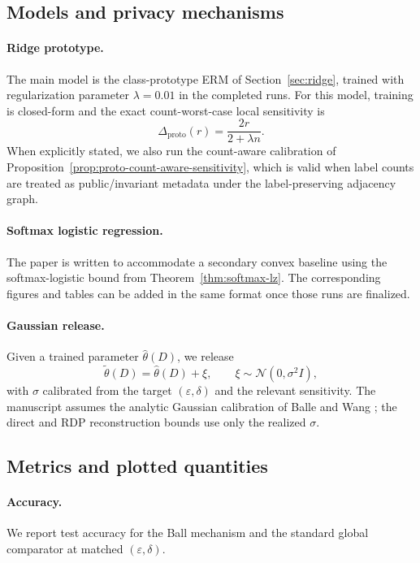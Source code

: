 \documentclass[conference,compsoc]{IEEEtran}
\begin{document}
\subsection{Models and privacy mechanisms}
\paragraph{Ridge prototype.}
The main model is the class-prototype ERM of Section~\ref{sec:ridge}, trained with regularization parameter $\lambda=0.01$ in the completed runs. For this model, training is closed-form and the exact count-worst-case local sensitivity is
\[
\Delta_{\mathrm{proto}}(r)=\frac{2r}{2+\lambda n}.
\]
When explicitly stated, we also run the count-aware calibration of Proposition~\ref{prop:proto-count-aware-sensitivity}, which is valid when label counts are treated as public/invariant metadata under the label-preserving adjacency graph.

\paragraph{Softmax logistic regression.}
The paper is written to accommodate a secondary convex baseline using the softmax-logistic bound from Theorem~\ref{thm:softmax-lz}. The corresponding figures and tables can be added in the same format once those runs are finalized.

\paragraph{Gaussian release.}
Given a trained parameter $\widehat\theta(D)$, we release
\[
\widetilde\theta(D)=\widehat\theta(D)+\xi,
\qquad
\xi\sim\mathcal{N}(0,\sigma^2 I),
\]
with $\sigma$ calibrated from the target $(\varepsilon,\delta)$ and the relevant sensitivity. The manuscript assumes the analytic Gaussian calibration of Balle and Wang \cite{balle2018analytic}; the direct and RDP reconstruction bounds use only the realized $\sigma$.

\subsection{Metrics and plotted quantities}
\paragraph{Accuracy.}
We report test accuracy for the Ball mechanism and the standard global comparator at matched $(\varepsilon,\delta)$.
\end{document}
